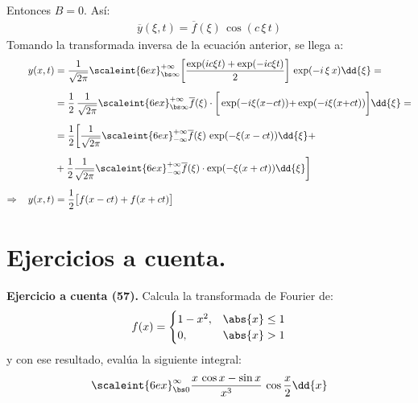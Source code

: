 Entonces  $B = 0$. Así:
\begin{align*}
\overline{y}(\xi, t) = \overline{f}(\xi) \, \cos (c \, \xi \, t)
\end{align*}
Tomando la transformada inversa de la ecuación anterior, se llega a:
\begin{align*}
y(x, t) &= \dfrac{1}{\sqrt{2 \pi}} \scaleint{6ex}_{\bs \infty}^{+ \infty} \bigg[ \dfrac{\exp(i c \xi t) + \exp(-i c \xi t)}{2} \bigg] \, \exp(-i \, \xi \, x) \dd{\xi} = \\[0.5em]
&= \dfrac{1}{2} \, \dfrac{1}{\sqrt{2 \pi}} \scaleint{6ex}_{\bs \infty}^{+ \infty} \overline{f} (\xi) \cdot \bigg[ \exp(-i \xi (x {-} c t)) {+} \exp(-i \xi (x {+} c t)) \bigg] \dd{\xi} = \\[0.5em]
&= \dfrac{1}{2} \bigg[ \dfrac{1}{\sqrt{2 \pi}} \scaleint{6ex}_{-\infty}^{+\infty} \overline{f} (\xi) \, \exp(- \xi (x - c t)) \dd{\xi} + \\[0.5em]
&+ \dfrac{1}{2} \dfrac{1}{\sqrt{2 \pi}} \scaleint{6ex}_{-\infty}^{+\infty} \overline{f} (\xi) \cdot \exp(- \xi (x + c t)) \dd{\xi} \bigg] \\[0.5em]
\Rightarrow \hspace{0.3cm} y(x, t) &= \dfrac{1}{2} \big[ f(x -c t) + f(x +  ct) \big]
\end{align*}

\newpage
\section{Ejercicios a cuenta.}

\noindent
\textbf{Ejercicio a cuenta (57). } Calcula la transformada de Fourier de:
\begin{align*}
f(x) = \begin{cases}
1 - x^{2}, & \abs{x} \leq 1 \\
0, & \abs{x} > 1
\end{cases}
\end{align*}
y con ese resultado, evalúa la siguiente integral:
\begin{align*}
\scaleint{6ex}_{\bs0}^{\infty} \dfrac{x \, \cos x - \sin x}{x^{3}} \, \cos \dfrac{x}{2} \dd{x}
\end{align*}

